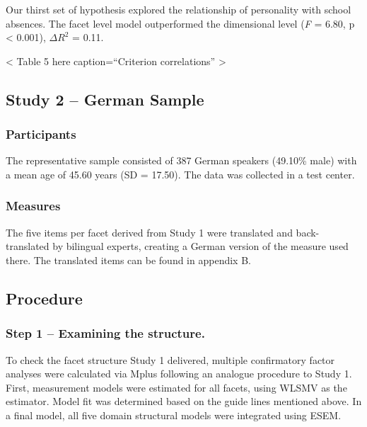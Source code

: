 \documentclass[,man,floatsintext]{apa6}
\begin{document}
Our thirst set of hypothesis explored the relationship of personality
with school absences. The facet level model outperformed the dimensional
level (\emph{F} = 6.80, p \textless{} 0.001), \(\Delta R^2\) = 0.11.

\vspace{5mm}

\textless{} Table 5 here caption=\enquote{Criterion correlations}
\textgreater{}

\vspace{5mm}

\subsection{Study 2 -- German Sample}\label{study-2-german-sample}

\subsubsection{Participants}\label{participants-1}

The representative sample consisted of 387 German speakers (49.10\%
male) with a mean age of 45.60 years (SD = 17.50). The data was
collected in a test center.

\subsubsection{Measures}\label{measures-1}

The five items per facet derived from Study 1 were translated and
back-translated by bilingual experts, creating a German version of the
measure used there. The translated items can be found in appendix B.

\subsection{Procedure}\label{procedure-1}

\subsubsection{Step 1 -- Examining the
structure.}\label{step-1-examining-the-structure.}

To check the facet structure Study 1 delivered, multiple confirmatory
factor analyses were calculated via Mplus following an analogue
procedure to Study 1. First, measurement models were estimated for all
facets, using WLSMV as the estimator. Model fit was determined based on
the guide lines mentioned above. In a final model, all five domain
structural models were integrated using ESEM.
\end{document}
